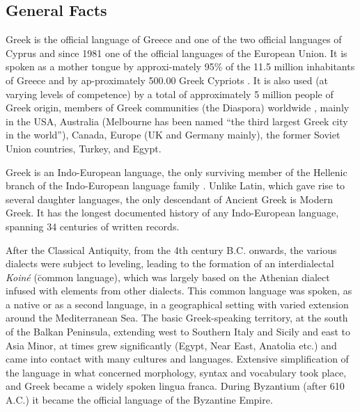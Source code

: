 \documentclass[]{../../metanetpaper}
\begin{document}
\clearpage


\begin{multicols}{2}

\subsection{General Facts}

Greek is the official language of Greece and one of the two official languages of Cyprus and since 1981 one of the official languages of the European Union. It is spoken as a mother tongue by approxi-mately 95\% of the 11.5 million inhabitants of Greece and by ap-proximately 500.00 Greek Cypriots \cite{Stat1}. It is also used (at varying levels of competence) by a total of approximately 5 million people of Greek origin, members of Greek communities (the Diaspora) worldwide  \cite{Dias1}, mainly in the USA, Australia (Melbourne has been named “the third largest Greek city in the world”), Canada, Europe (UK and Germany mainly), the former Soviet Union countries, Turkey, and Egypt. 

Greek is an Indo-European language, the only surviving member of the Hellenic branch of the Indo-European language family \cite{Trud1}. Unlike Latin, which gave rise to several daughter languages, the only descendant of Ancient Greek is Modern Greek. It has the longest documented history of any Indo-European language, spanning 34 centuries of written records.

After the Classical Antiquity, from the 4th century B.C. onwards, the various dialects were subject to leveling, leading to the formation of an interdialectal \textit{Koiné} (\=common language), which was largely based on the Athenian dialect infused with elements from other dialects. This common language was spoken, as a native or as a second language, in a geographical setting with varied extension around the Mediterranean Sea. The basic Greek-speaking territory, at the south of the Balkan Peninsula, extending west to Southern Italy and Sicily and east to Asia Minor, at times grew significantly (Egypt, Near East, Anatolia etc.) and came into contact with many cultures and languages. Extensive simplification of the language in what concerned morphology, syntax and vocabulary took place, and Greek became a widely spoken lingua franca. During Byzantium (after 610 A.C.) it became the official language of the Byzantine Empire.


\end{multicols}
\end{document}
